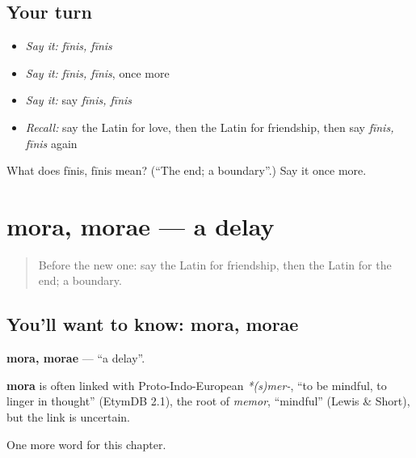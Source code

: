 \subsection*{Your turn}
\begin{itemize}
\raggedright
  \item \emph{Say it:} \emph{fīnis, fīnis}
  \item \emph{Say it:} \emph{fīnis, fīnis}, once more
  \item \emph{Say it:} say \emph{fīnis, fīnis}
  \item \emph{Recall:} say the Latin for love, then the Latin for friendship, then say \emph{fīnis, fīnis} again
\end{itemize}

\begin{tcolorbox}[breakable,colback=teal!4,colframe=teal!35!black,title={Before you move on}]
What does fīnis, fīnis mean? (\textquotedblleft{}The end; a boundary\textquotedblright{}.) Say it once more.
\end{tcolorbox}
\section[mora, morae]{mora, morae — a delay}

\label{lesson:LA-C237-mora}



\begin{quote}
Before the new one: say the Latin for friendship, then the Latin for the end; a boundary.
\end{quote}

\subsection*{You'll want to know: mora, morae}
\textbf{mora, morae} — \textquotedblleft{}a delay\textquotedblright{}.

\begin{cousinweb}
\textbf{mora} is often linked with Proto-Indo-European \emph{*(s)mer-}, \textquotedblleft{}to be mindful, to linger in thought\textquotedblright{} (EtymDB 2.1), the root of \emph{memor}, \textquotedblleft{}mindful\textquotedblright{} (Lewis \& Short), but the link is uncertain.
\end{cousinweb}

\begin{grammarlens}[title={What you've built}]
One more word for this chapter.
\end{grammarlens}

